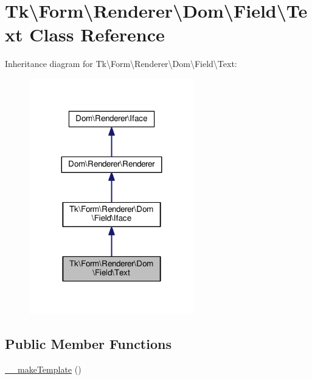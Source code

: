 \hypertarget{classTk_1_1Form_1_1Renderer_1_1Dom_1_1Field_1_1Text}{\section{Tk\textbackslash{}Form\textbackslash{}Renderer\textbackslash{}Dom\textbackslash{}Field\textbackslash{}Text Class Reference}
\label{classTk_1_1Form_1_1Renderer_1_1Dom_1_1Field_1_1Text}
}


Inheritance diagram for Tk\textbackslash{}Form\textbackslash{}Renderer\textbackslash{}Dom\textbackslash{}Field\textbackslash{}Text\+:\nopagebreak
\begin{figure}[H]
\begin{center}
\leavevmode
\includegraphics[width=203pt]{classTk_1_1Form_1_1Renderer_1_1Dom_1_1Field_1_1Text__inherit__graph}
\end{center}
\end{figure}
\subsection*{Public Member Functions}
\begin{DoxyCompactItemize}
\item 
\hyperlink{classTk_1_1Form_1_1Renderer_1_1Dom_1_1Field_1_1Text_a253cab52a25e6803b7e4bf6940732fdd}{\+\_\+\+\_\+make\+Template} ()
\end{DoxyCompactItemize}
